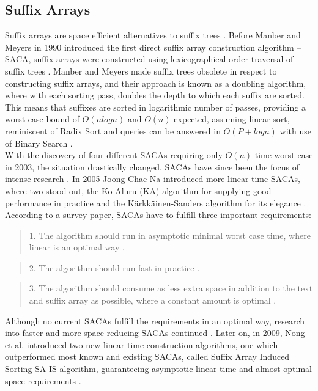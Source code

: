 \documentclass[12pt]{article} %
\begin{document}
\subsection{Suffix Arrays} \label{Suffix Arrays Section}

Suffix arrays are space efficient alternatives to suffix trees \cite{gusfield,twoeffecient}. Before Manber and Meyers in 1990 introduced the first direct suffix array construction algorithm – SACA, suffix arrays were constructed using lexicographical order traversal of suffix trees  \cite{gusfield,twoeffecient, performancesuffix, newapproach}. Manber and Meyers made suffix trees obsolete in respect to constructing suffix arrays, and their approach is known as a doubling algorithm, where with each sorting pass, doubles the depth to which each suffix are sorted. This means that suffixes are sorted in logarithmic number of passes, providing a worst-case bound of $O(n log n)$ and $O(n)$ expected, assuming linear sort, reminiscent of Radix Sort \cite{performancesuffix} and queries can be answered in $O(P + log n)$ with use of Binary Search \cite{gusfield}.
\\
With the discovery of four different SACAs requiring only $O(n)$ time worst case in 2003, the situation drastically changed. SACAs have since been the focus of intense research \cite{performancesuffix,newapproach}. In 2005 Joong Chae Na introduced more linear time SACAs, where two stood out, the Ko-Aluru (KA) algorithm for supplying good performance in practice and the Kärkkäinen-Sanders algorithm for its elegance \cite{newapproach}. 
\\
According to a survey paper, SACAs have to fulfill three important requirements: 
\begin{quote}
1. The algorithm should run in asymptotic minimal worst case time, where linear is an optimal way \cite{newapproach}. 
\end{quote}
\begin{quote}
2. The algorithm should run fast in practice \cite{newapproach}.
\end{quote}
\begin{quote}
3. The algorithm should consume as less extra space in addition to the text and suffix array as possible, where a constant amount is optimal \cite{newapproach}.
\end{quote}
Although no current SACAs fulfill the requirements in an optimal way, research into faster and more space reducing SACAs continued \cite{newapproach}. Later on, in 2009, Nong et al. introduced two new linear time construction algorithms, one which outperformed most known and existing SACAs, called Suffix Array Induced Sorting SA-IS algorithm, guaranteeing asymptotic linear time and almost optimal space requirements \cite{newapproach}. 
\end{document}
